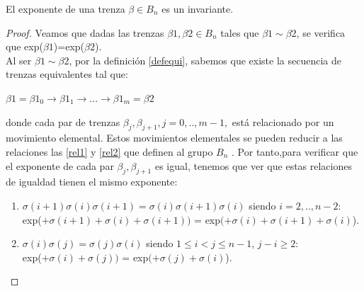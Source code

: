 \documentclass[14pt]{extarticle}
\begin{document}
\begin{pro}
	El exponente de una trenza $\beta \in B_{n}$ es un invariante. 
	\begin{proof}
		Veamos que dadas las trenzas $\beta1,\beta2 \in B_{n}$ tales que $\beta1 \sim \beta2$, se verifica que exp($\beta1$)=exp($\beta2$).\\
		
		Al ser $\beta1 \sim \beta2$, por la definición \ref{defequi}, sabemos que existe la secuencia de trenzas equivalentes tal que: 
		\begin{center}
			$ \beta1 = \beta1_{0} \rightarrow \beta1_{1} \rightarrow ... \rightarrow \beta1_{m}=\beta2$ 
		\end{center}
	    donde cada par de trenzas $ \beta_{j}, \beta_{j+1}, j=0,..,m-1, $ está relacionado por un movimiento elemental. Estos movimientos elementales se pueden reducir a las relaciones las  \ref{rel1} y \ref{rel2} que definen al grupo $ B_{n} $ . Por tanto,para verificar que el exponente de cada par $ \beta_{j}, \beta_{j+1}$ es igual, tenemos que ver que estas relaciones de igualdad tienen el mismo exponente:
	    
	    \begin{enumerate}
	    \item $\sigma(i+1)\sigma(i)\sigma(i+1) =\sigma(i)\sigma(i+1)\sigma(i) $ siendo $i=2,..,n-2 $:\\
	    exp($ +\sigma(i+1)+\sigma(i)+\sigma(i+1))$ = exp$(+\sigma(i)+\sigma(i+1)+\sigma(i) $).
	    \item $\sigma(i)\sigma(j)=\sigma(j)\sigma(i)$ siendo $1 \le i < j \le n-1 $, $j-i \geq 2$:\\
	    exp($+\sigma(i)+\sigma(j))$ = exp$(+\sigma(j)+\sigma(i)$).  	
	    \end{enumerate}
	\end{proof}
\end{pro}
\end{document}
